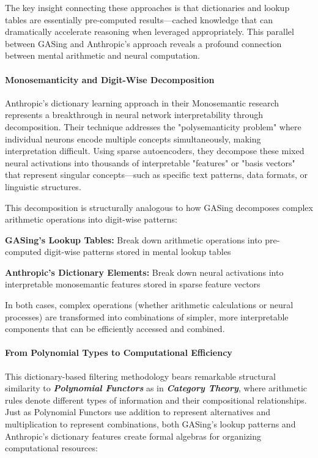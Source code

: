The key insight connecting these approaches is that dictionaries and lookup tables are essentially pre-computed results—cached knowledge that can dramatically accelerate reasoning when leveraged appropriately. This parallel between GASing and Anthropic's approach reveals a profound connection between mental arithmetic and neural computation.
\paragraph{Monosemanticity and Digit-Wise Decomposition}

Anthropic's dictionary learning approach in their Monosemantic research represents a breakthrough in neural network interpretability through decomposition. Their technique addresses the "polysemanticity problem" where individual neurons encode multiple concepts simultaneously, making interpretation difficult. Using sparse autoencoders, they decompose these mixed neural activations into thousands of interpretable "features" or "basis vectors" that represent singular concepts—such as specific text patterns, data formats, or linguistic structures.

This decomposition is structurally analogous to how GASing decomposes complex arithmetic operations into digit-wise patterns:


\noindent\textbf{\textbf{GASing's Lookup Tables}:} Break down arithmetic operations into pre-computed digit-wise patterns stored in mental lookup tables


\noindent\textbf{\textbf{Anthropic's Dictionary Elements}:} Break down neural activations into interpretable monosemantic features stored in sparse feature vectors


In both cases, complex operations (whether arithmetic calculations or neural processes) are transformed into combinations of simpler, more interpretable components that can be efficiently accessed and combined.
\paragraph{From Polynomial Types to Computational Efficiency}

This dictionary-based filtering methodology bears remarkable structural similarity to \textbf{\textbf{\textit{Polynomial Functors}}} as in \textbf{\textit{Category Theory}}, where arithmetic rules denote different types of information and their compositional relationships. Just as Polynomial Functors use addition to represent alternatives and multiplication to represent combinations, both GASing's lookup patterns and Anthropic's dictionary features create formal algebras for organizing computational resources:


